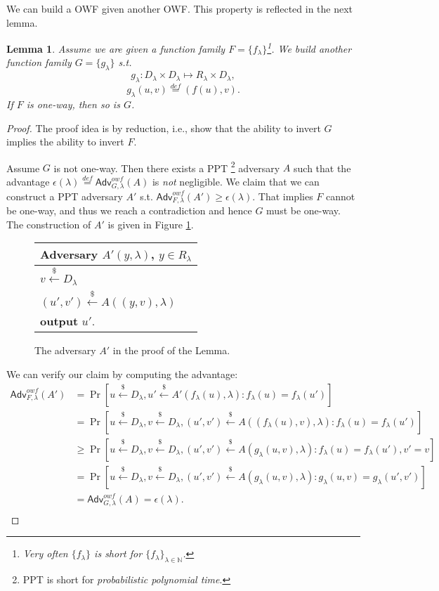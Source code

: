 \documentclass[12pt]{article}
\newcommand{\eqdef}{\stackrel{def}{=}}
\newcommand{\N}{\mathbb{N}}
\newcommand{\getsr}{\stackrel{\$}{\gets}}
\newcommand{\Adv}{\textsf{Adv}}
\newtheorem{lemma}[theorem]{Lemma}
\theoremstyle{definition}
\begin{document}
We can build a OWF given another OWF. This property is reflected in the next lemma.
\begin{lemma}
Assume we are given a function family $F = \{f_\lambda\}$\footnote{Very often $ \{f_\lambda\}$ is short for $ \{f_\lambda\}_{\lambda\in\N}$.}.
We build another function family $G = \{g_\lambda\}$ s.t.
$$g_\lambda : D_\lambda \times D_\lambda \mapsto R_\lambda \times D_\lambda,$$
$$g_\lambda(u,v) \eqdef (f(u), v).$$
If $F$ is one-way, then so is $G$.
\end{lemma}
\begin{proof}
The proof idea is by reduction, i.e., show that the ability to invert $G$ implies the ability to invert $F$.

Assume $G$ is not one-way. Then there exists a PPT \footnote{PPT is short for \emph{probabilistic polynomial time}.} adversary $A$ such that the advantage $\epsilon(\lambda) \eqdef \Adv_{G,\lambda}^{owf}(A)$ is \emph{not} negligible. We claim that we can construct a PPT adversary $A'$ s.t. $\Adv_{F,\lambda}^{owf}(A') \geq \epsilon(\lambda)$. That implies $F$ cannot be one-way, and thus we reach a contradiction and hence $G$ must be one-way. The construction of $A'$ is given in Figure \ref{fig:ad}.

\begin{figure}[!ht]
\centering
\begin{tabular}{l}
Adversary $A'(y,\lambda)$, $y\in R_\lambda$\\
\hline
$v \getsr D_\lambda$ \\
$(u',v') \getsr A((y,v),\lambda)$ \\
{\bf output} $u'$.\\
\end{tabular}
\caption{The adversary $A'$ in the proof of the Lemma.}
\label{fig:ad}
\end{figure}

We can verify our claim by computing the advantage:
$$
\begin{aligned}
\Adv_{F,\lambda}^{owf} (A') 
&= \Pr [u\getsr D_\lambda, u'\getsr A'(f_\lambda(u), \lambda) : f_\lambda(u) = f_\lambda(u')] \\
&= \Pr [u\getsr D_\lambda, v\getsr D_\lambda, (u', v')\getsr A((f_\lambda(u), v), \lambda) : f_\lambda(u) = f_\lambda(u')] \\
&\geq \Pr [u\getsr D_\lambda, v\getsr D_\lambda, (u', v')\getsr A(g_\lambda(u, v), \lambda) : f_\lambda(u) = f_\lambda(u'), v' = v] \\
&= \Pr [u\getsr D_\lambda, v\getsr D_\lambda, (u', v')\getsr A(g_\lambda(u, v), \lambda) : g_\lambda(u, v) = g_\lambda(u', v')] \\
&= \Adv_{G,\lambda}^{owf}(A) = \epsilon(\lambda). \\
\end{aligned}
$$
\end{proof}
\end{document}
